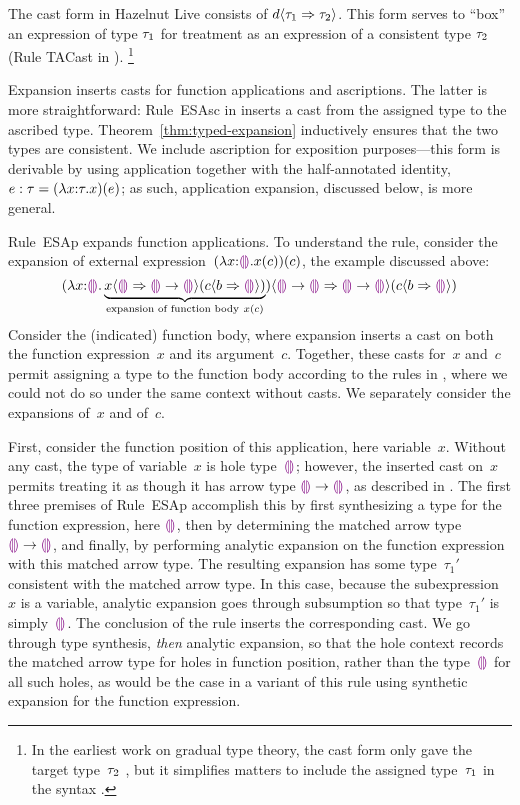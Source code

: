 The cast form in Hazelnut Live consists of $d \langle{\tau_1}\Rightarrow{\tau_2}\rangle$.
%
This form serves to ``box'' an expression of type $\tau_1$ for
treatment as an expression of a consistent type $\tau_2$
(Rule TACast in ).
%
\footnote{
In the earliest work on gradual type theory, the cast form only gave
the target type~$\tau_2$ \cite{Siek06a}, but it simplifies matters
to include the assigned type~$\tau_1$ in the syntax \cite{DBLP:conf/snapl/SiekVCB15}.
}

Expansion inserts casts for function applications and ascriptions.
%
The latter is more straightforward: Rule~{ESAsc}
in  inserts a cast from the assigned type to the
ascribed type.
%
Theorem~\ref{thm:typed-expansion} inductively ensures that the two
types are consistent.
%
We include ascription for exposition purposes---this form is derivable
by using application together with the half-annotated identity, $e
: \tau = (\lambda x{:}\tau.x)(e)$; as such, application
expansion, discussed below, is more general.

Rule~{ESAp} expands function applications.
%
To understand the rule, consider the expansion of external
expression~$(\lambda x{:}\textcolor{violet}{\llparenthesis}\textcolor{violet}{\rrparenthesis}.x(c))(c)$, the example
discussed above:
\[
        \hap{\dcasttwo{
        (\halam{x}{\tehole}{\underbrace{
                \hap{\dcasttwo{x}{\tehole}{\tarr{\tehole}{\tehole}}}
                {\dcasttwo{c}{b}{\tehole}}
                }_{\textrm{expansion of function body}~x(c)}
        }
        )}{\tarr{\tehole}{\tehole}}{
           \tarr{\tehole}{\tehole}}
           }
           {\dcasttwo{c}{b}{\tehole}}
\]
Consider the (indicated) function body,
%
where expansion inserts a cast on both the function expression~$x$ and its argument~$c$.
%
Together, these casts for~$x$ and~$c$ permit assigning a type to the
function body according to the rules in , where we
could not do so under the same context without casts.
%
We separately consider the expansions of~$x$ and of~$c$.

First, consider the function position of this application, here variable~$x$.
%
Without any cast, the type of variable~$x$ is hole type~$\textcolor{violet}{\llparenthesis}\textcolor{violet}{\rrparenthesis}$;
however, the inserted cast on~$x$ permits treating it as though it has
arrow type $\textcolor{violet}{\llparenthesis}\textcolor{violet}{\rrparenthesis} \rightarrow \textcolor{violet}{\llparenthesis}\textcolor{violet}{\rrparenthesis}$, as described
in .
%
The first three premises of Rule~{ESAp} accomplish this
%
by first synthesizing a type for the function expression, here
$\textcolor{violet}{\llparenthesis}\textcolor{violet}{\rrparenthesis}$, then
%
by determining the matched arrow type~$\textcolor{violet}{\llparenthesis}\textcolor{violet}{\rrparenthesis} \rightarrow \textcolor{violet}{\llparenthesis}\textcolor{violet}{\rrparenthesis}$, and
finally,
%
by performing analytic expansion on the function expression with this
matched arrow type.
%
The resulting expansion has some type~$\tau_1'$ consistent with the matched arrow type.
%
In this case, because the subexpression~$x$ is a variable, analytic
expansion goes through subsumption so that type~$\tau_1'$ is
simply~$\textcolor{violet}{\llparenthesis}\textcolor{violet}{\rrparenthesis}$.
%
The conclusion of the rule inserts the corresponding cast.
%
We go through type synthesis, \emph{then} analytic expansion, so that the hole
context records the matched arrow type for holes in function position,
rather than the type~$\textcolor{violet}{\llparenthesis}\textcolor{violet}{\rrparenthesis}$ for all such holes, as would be the case
in a variant of this rule using synthetic expansion for the function
expression.


